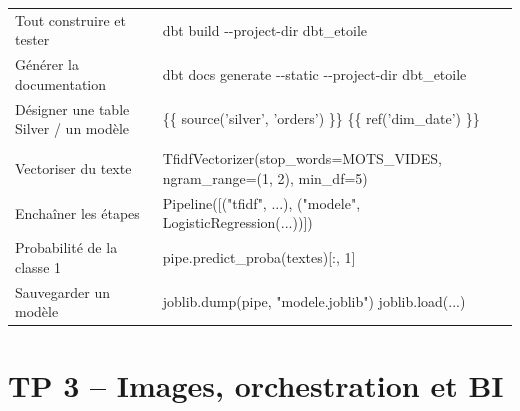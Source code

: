 \begin{center}
\begin{tabularx}{\textwidth}{@{}>{\raggedright\arraybackslash}p{4.1cm} >{\raggedright\arraybackslash\ttfamily\footnotesize}X@{}}
Tout construire et tester & dbt build -{}-project-dir dbt\_etoile \\
Générer la documentation & dbt docs generate -{}-static -{}-project-dir dbt\_etoile \\
Désigner une table Silver / un modèle & \{\{ source('silver', 'orders') \}\} \quad \{\{ ref('dim\_date') \}\} \\
\midrule
\multicolumn{2}{@{}l}{\textbf{\textcolor{lhblue}{scikit-learn}}} \\
Vectoriser du texte & TfidfVectorizer(stop\_words=MOTS\_VIDES, ngram\_range=(1, 2), min\_df=5) \\
Enchaîner les étapes & Pipeline([("tfidf", ...), ("modele", LogisticRegression(...))]) \\
Probabilité de la classe 1 & pipe.predict\_proba(textes)[:, 1] \\
Sauvegarder un modèle & joblib.dump(pipe, "modele.joblib") \quad joblib.load(...) \\
\bottomrule
\end{tabularx}
\end{center}

\section{TP 3 -- Images, orchestration et BI}\label{ann:aide-c5}

